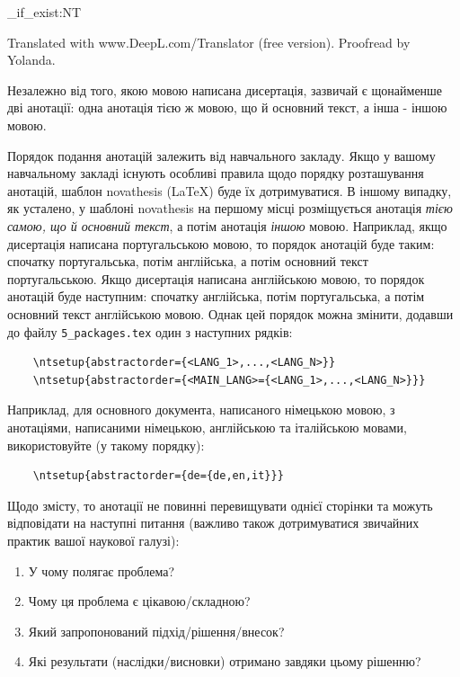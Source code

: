 
\ExplSyntaxOn
\cs_if_exist:NT \TitleOnHeader
  { \TitleOnHeader }
\ExplSyntaxOff

\begin{otherlanguage}{english}
  Translated with www.DeepL.com/Translator (free version). Proofread by Yolanda.
\end{otherlanguage}

Незалежно від того, якою мовою написана дисертація, зазвичай є щонайменше дві анотації: одна анотація тією ж мовою, що й основний текст, а інша - іншою мовою.

Порядок подання анотацій залежить від навчального закладу. Якщо у вашому навчальному закладі існують особливі правила щодо порядку розташування анотацій, шаблон \gls{novathesis} (\LaTeX) буде їх дотримуватися. В іншому випадку, як усталено, у шаблоні \gls{novathesis} на першому місці розміщується анотація \emph{тією самою, що й основний текст}, а потім анотація \emph{іншою} мовою. Наприклад, якщо дисертація написана португальською мовою, то порядок анотацій буде таким: спочатку португальська, потім англійська, а потім основний текст португальською. Якщо дисертація написана англійською мовою, то порядок анотацій буде наступним: спочатку англійська, потім португальська, а потім основний текст англійською мовою.
%
Однак цей порядок можна змінити, додавши до файлу \verb+5_packages.tex+ один з наступних рядків:
 
\begin{verbatim}
    \ntsetup{abstractorder={<LANG_1>,...,<LANG_N>}}
    \ntsetup{abstractorder={<MAIN_LANG>={<LANG_1>,...,<LANG_N>}}}
\end{verbatim}

Наприклад, для основного документа, написаного німецькою мовою, з анотаціями, написаними німецькою, англійською та італійською мовами, використовуйте (у такому порядку):

\begin{verbatim}
    \ntsetup{abstractorder={de={de,en,it}}}
\end{verbatim}

Щодо змісту, то анотації не повинні перевищувати однієї сторінки та можуть відповідати на наступні питання (важливо також дотримуватися звичайних практик вашої наукової галузі):

\begin{enumerate}
  \item У чому полягає проблема?
  \item Чому ця проблема є цікавою/складною?
  \item Який запропонований підхід/рішення/внесок?
  \item Які результати (наслідки/висновки) отримано завдяки цьому рішенню?
\end{enumerate}

